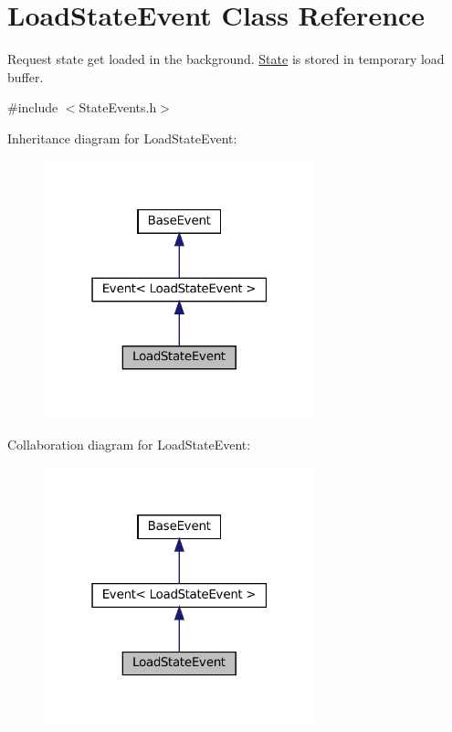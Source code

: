 \hypertarget{classLoadStateEvent}{}\section{Load\+State\+Event Class Reference}
\label{classLoadStateEvent}


Request state get loaded in the background. \hyperlink{classState}{State} is stored in temporary load buffer.  




{\ttfamily \#include $<$State\+Events.\+h$>$}



Inheritance diagram for Load\+State\+Event\+:\nopagebreak
\begin{figure}[H]
\begin{center}
\leavevmode
\includegraphics[width=223pt]{classLoadStateEvent__inherit__graph}
\end{center}
\end{figure}


Collaboration diagram for Load\+State\+Event\+:\nopagebreak
\begin{figure}[H]
\begin{center}
\leavevmode
\includegraphics[width=223pt]{classLoadStateEvent__coll__graph}
\end{center}
\end{figure}
